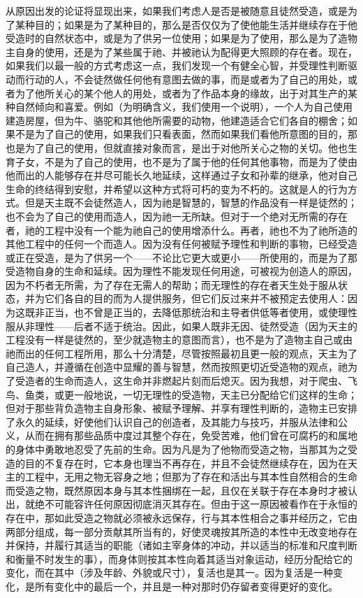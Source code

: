 从原因出发的论证将显现出来，如果我们考虑人是否是被随意且徒然受造，或是为了某种目的；如果是为了某种目的，那么是否仅仅为了使他能生活并继续存在于他受造时的自然状态中，或是为了供另一位使用；如果是为了使用，那么是为了造物主自身的使用，还是为了某些属于祂、并被祂认为配得更大照顾的存在者。现在，如果我们以最一般的方式考虑这一点，我们发现一个有健全心智，并受理性判断驱动而行动的人，不会徒然做任何他有意图去做的事，而是或者为了自己的用处，或者为了他所关心的某个他人的用处，或者为了作品本身的缘故，出于对其生产的某种自然倾向和喜爱。例如（为明确含义，我们使用一个说明），一个人为自己使用建造房屋，但为牛、骆驼和其他他所需要的动物，他建造适合它们各自的棚舍；如果不是为了自己的使用，如果我们只看表面，然而如果我们看他所意图的目的，那也是为了自己的使用，但就直接对象而言，是出于对他所关心之物的关切。他也生育子女，不是为了自己的使用，也不是为了属于他的任何其他事物，而是为了使由他而出的人能够存在并尽可能长久地延续，这样通过子女和孙辈的继承，他对自己生命的终结得到安慰，并希望以这种方式将可朽的变为不朽的。这就是人的行为方式。但是天主既不会徒然造人，因为祂是智慧的，智慧的作品没有一样是徒然的；也不会为了自己的使用而造人，因为祂一无所缺。但对于一个绝对无所需的存在者，祂的工程中没有一个能为祂自己的使用增添什么。再者，祂也不为了祂所造的其他工程中的任何一个而造人。因为没有任何被赋予理性和判断的事物，已经受造或正在受造，是为了供另一个——不论比它更大或更小——所使用的，而是为了那受造物自身的生命和延续。因为理性不能发现任何用途，可被视为创造人的原因，因为不朽者无所需，为了存在无需人的帮助；而无理性的存在者天生处于服从状态，并为它们各自的目的而为人提供服务，但它们反过来并不被预定去使用人：因为这既非正当，也不曾是正当的，去降低那统治和主导者供低等者使用，或使理性服从非理性——后者不适于统治。因此，如果人既非无因、徒然受造（因为天主的工程没有一样是徒然的，至少就造物主的意图而言），也不是为了造物主自己或由祂而出的任何工程所用，那么十分清楚，尽管按照最初且更一般的观点，天主为了自己造人，并遵循在创造中显耀的善与智慧，然而按照更切近受造物的观点，祂为了受造者的生命而造人，这生命并非燃起片刻而后熄灭。因为我想，对于爬虫、飞鸟、鱼类，或更一般地说，一切无理性的受造物，天主已分配给它们这样的生命；但对于那些背负造物主自身形象、被赋予理解、并享有理性判断的，造物主已安排了永久的延续，好使他们认识自己的创造者，及其能力与技巧，并服从法律和公义，从而在拥有那些品质中度过其整个存在，免受苦难，他们曾在可腐朽的和属地的身体中勇敢地忍受了先前的生命。因为凡是为了他物而受造之物，当那其为之受造的目的不复存在时，它本身也理当不再存在，并且不会徒然继续存在，因为在天主的工程中，无用之物无容身之地；但那为了存在和活出与其本性自然相合的生命而受造之物，既然原因本身与其本性捆绑在一起，且仅在关联于存在本身时才被认出，就绝不可能容许任何原因彻底消灭其存在。但由于这一原因被看作在于永恒的存在中，那如此受造之物就必须被永远保存，行与其本性相合之事并经历之，它由两部分组成，每一部分贡献其所当有的，好使灵魂按其所造的本性中无改变地存在并保持，并履行其适当的职能（诸如主宰身体的冲动，并以适当的标准和尺度判断和衡量不时发生的事），而身体则按其本性向着其适当对象运动，经历分配给它的变化，而在其中（涉及年龄、外貌或尺寸），复活也是其一。因为复活是一种变化，是所有变化中的最后一个，并且是一种对那时仍存留者变得更好的变化。\par

